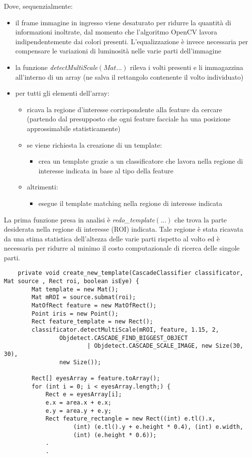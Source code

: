 Dove, sequenzialmente:
\begin{itemize}
\item il frame immagine in ingresso viene desaturato per ridurre la quantità di informazioni inoltrate, dal momento che l'algoritmo OpenCV lavora indipendentemente dai colori presenti. L'equalizzazione è invece necessaria per compensare le variazioni di luminosità nelle varie parti dell'immagine
\item la funzione \textit{detectMultiScale$(Mat ...)$} rileva i volti presenti e li immagazzina all'interno di un array (ne salva il rettangolo contenente il volto individuato)
\item per tutti gli elementi dell'array:
\begin{itemize}
\item ricava la regione d'interesse corrispondente alla feature da cercare (partendo dal presupposto che ogni feature facciale ha una posizione approssimabile statisticamente)
\item se viene richiesta la creazione di un template:
\begin{itemize}
\item crea un template grazie a un classificatore che lavora nella regione di interesse indicata in base al tipo della feature
\end{itemize}
\item altrimenti:
\begin{itemize}
\item esegue il template matching nella regione di interesse indicata
\end{itemize}
\end{itemize}
\end{itemize}

La prima funzione presa in analisi è \textit{redo\_template$(...)$} che trova la parte desiderata nella regione di interesse (ROI) indicata. 
Tale regione è stata ricavata da una stima statistica dell'altezza delle varie parti rispetto al volto ed è necessaria per ridurre al minimo il costo computazionale di ricerca delle singole parti. 

\begin{lstlisting}
    private void create_new_template(CascadeClassifier classificator, Mat source , Rect roi, boolean isEye) {
        Mat template = new Mat();
        Mat mROI = source.submat(roi);
        MatOfRect feature = new MatOfRect();
        Point iris = new Point();
        Rect feature_template = new Rect();
        classificator.detectMultiScale(mROI, feature, 1.15, 2,
                Objdetect.CASCADE_FIND_BIGGEST_OBJECT
                        | Objdetect.CASCADE_SCALE_IMAGE, new Size(30, 30),
                new Size());
 
        Rect[] eyesArray = feature.toArray();
        for (int i = 0; i < eyesArray.length;) {
            Rect e = eyesArray[i];
            e.x = area.x + e.x;
            e.y = area.y + e.y;
            Rect feature_rectangle = new Rect((int) e.tl().x,
                    (int) (e.tl().y + e.height * 0.4), (int) e.width,
                    (int) (e.height * 0.6));
            .
            .            
 \end{lstlisting} 
 
